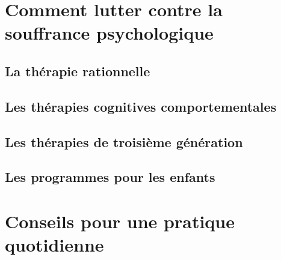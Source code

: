 \documentclass[]{book}
\begin{document}
\hypertarget{comment-lutter-contre-la-souffrance-psychologique}{%
\chapter{Comment lutter contre la souffrance psychologique}\label{comment-lutter-contre-la-souffrance-psychologique}}

\hypertarget{la-therapie-rationnelle}{%
\section{La thérapie rationnelle}\label{la-therapie-rationnelle}}

\hypertarget{les-therapies-cognitives-comportementales}{%
\section{Les thérapies cognitives comportementales}\label{les-therapies-cognitives-comportementales}}

\hypertarget{les-therapies-de-troisieme-generation}{%
\section{Les thérapies de troisième génération}\label{les-therapies-de-troisieme-generation}}

\hypertarget{les-programmes-pour-les-enfants}{%
\section{Les programmes pour les enfants}\label{les-programmes-pour-les-enfants}}

\hypertarget{conseils-pour-une-pratique-quotidienne}{%
\chapter{Conseils pour une pratique quotidienne}\label{conseils-pour-une-pratique-quotidienne}}
\end{document}
